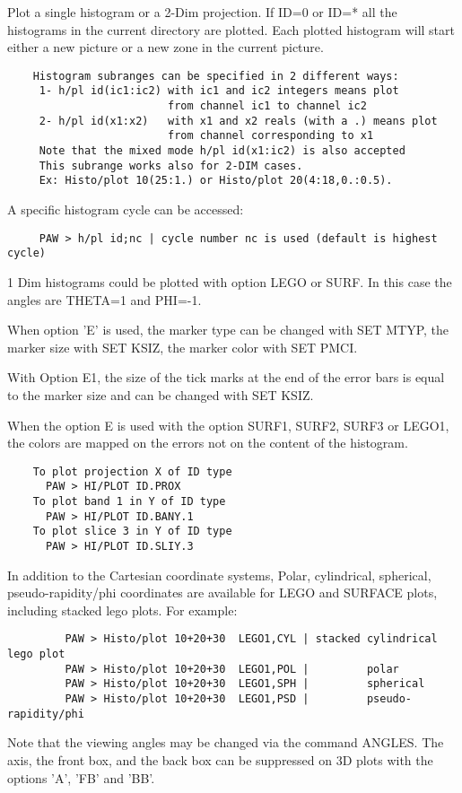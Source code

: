    \par
Plot a single histogram or a 2-Dim projection.  If ID=0 or ID=* all the 
   histograms in the current directory are plotted.  Each plotted histogram 
   will start either a new picture or a new zone in the current picture.  
\begin{verbatim}
    Histogram subranges can be specified in 2 different ways:
     1- h/pl id(ic1:ic2) with ic1 and ic2 integers means plot
                         from channel ic1 to channel ic2
     2- h/pl id(x1:x2)   with x1 and x2 reals (with a .) means plot
                         from channel corresponding to x1
     Note that the mixed mode h/pl id(x1:ic2) is also accepted
     This subrange works also for 2-DIM cases.
     Ex: Histo/plot 10(25:1.) or Histo/plot 20(4:18,0.:0.5).
\end{verbatim}
   \par
A specific histogram cycle can be accessed:  
\begin{verbatim}
     PAW > h/pl id;nc | cycle number nc is used (default is highest cycle)
\end{verbatim}
   \par
1 Dim histograms could be plotted with option LEGO or SURF.  In this case 
   the angles are THETA=1 and PHI=-1.  

   \par
When option 'E' is used, the marker type can be changed with SET MTYP, the 
   marker size with SET KSIZ, the marker color with SET PMCI.  

   \par
With Option E1, the size of the tick marks at the end of the error bars is 
   equal to the marker size and can be changed with SET KSIZ.  

   \par
When the option E is used with the option SURF1, SURF2, SURF3 or LEGO1, the 
   colors are mapped on the errors not on the content of the histogram.  

\begin{verbatim}
    To plot projection X of ID type
      PAW > HI/PLOT ID.PROX
    To plot band 1 in Y of ID type
      PAW > HI/PLOT ID.BANY.1
    To plot slice 3 in Y of ID type
      PAW > HI/PLOT ID.SLIY.3
\end{verbatim}
\ENDVERB
   \par
In addition to the Cartesian coordinate systems, Polar, cylindrical, 
   spherical, pseudo-rapidity/phi coordinates are available for LEGO and 
   SURFACE plots, including stacked lego plots.  For example:  
\begin{verbatim}
         PAW > Histo/plot 10+20+30  LEGO1,CYL | stacked cylindrical lego plot
         PAW > Histo/plot 10+20+30  LEGO1,POL |         polar
         PAW > Histo/plot 10+20+30  LEGO1,SPH |         spherical
         PAW > Histo/plot 10+20+30  LEGO1,PSD |         pseudo-rapidity/phi
\end{verbatim}
   \par
Note that the viewing angles may be changed via the command ANGLES.  The 
   axis, the front box, and the back box can be suppressed on 3D plots with 
   the options 'A', 'FB' and 'BB'.  

